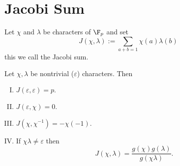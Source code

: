 \section{Jacobi Sum}

\begin{definition}
   Let \(\chi\) and \(\lambda\) be characters of \(\F_p\) and set \[J(\chi,
   \lambda) := \sum_{a + b = 1} \chi(a)\lambda(b)\] this we call the Jacobi
   sum.
\end{definition}

\begin{theorem}
   Let \(\chi, \lambda\) be nontrivial (\(\varepsilon\)) characters. Then
   \begin{enumerate}[I.]
      \item \(J(\varepsilon, \varepsilon) = p\).
      \item \(J(\varepsilon, \chi) = 0\).
      \item \(J(\chi, \chi^{-1}) = - \chi(-1)\).
      \item If  \(\chi\lambda \neq \varepsilon\) then
         \[
            J(\chi, \lambda) = \frac{g(\chi)g(\lambda)}{g(\chi\lambda)}.
         \] 
   \end{enumerate}
\end{theorem}

